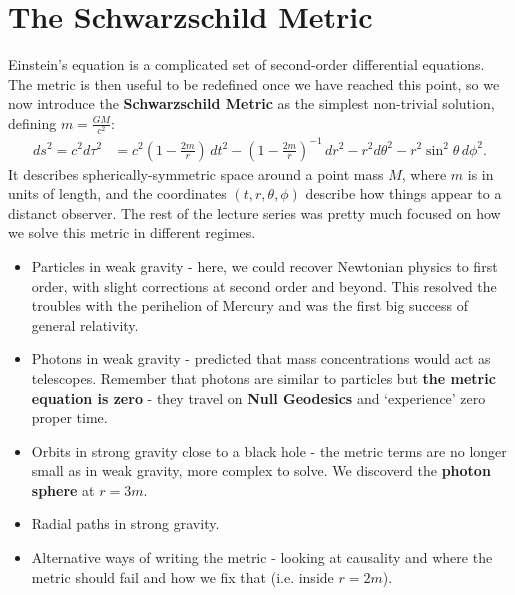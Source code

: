 \documentclass[a4paper, 11pt, normalem]{report}
\begin{document}
\section{The Schwarzschild Metric}
Einstein's equation is a complicated set of second-order differential equations. 
The metric is then useful to be redefined once we have reached this point, so we now introduce the \textbf{Schwarzschild Metric} as the simplest non-trivial solution, defining $m=\frac{GM}{c^2}$:
\begin{align}
    ds^2 = c^2d\tau^2 &= c^2\left(1-\frac{2m}{r}\right)\,dt^2 - \left(1-\frac{2m}{r}\right)^{-1}\,dr^2 - r^2d\theta^2 - r^2\sin^2\theta\,d\phi^2.
\end{align}
It describes spherically-symmetric space around a point mass $M$, where $m$ is in units of length, and the coordinates $(t,r,\theta,\phi)$ describe how things appear to a distanct observer.
The rest of the lecture series was pretty much focused on how we solve this metric in different regimes.
\begin{itemize}
    \item Particles in weak gravity - here, we could recover Newtonian physics to first order, with slight corrections at second order and beyond. 
        This resolved the troubles with the perihelion of Mercury and was the first big success of general relativity.
    \item Photons in weak gravity - predicted that mass concentrations would act as telescopes. 
        Remember that photons are similar to particles but \textbf{the metric equation is zero} - they travel on \textbf{Null Geodesics} and `experience' zero proper time. 
    \item Orbits in strong gravity close to a black hole - the metric terms are no longer small as in weak gravity, more complex to solve.
        We discoverd the \textbf{photon sphere} at $r=3m$.
    \item Radial paths in strong gravity.
    \item Alternative ways of writing the metric - looking at causality and where the metric should fail and how we fix that (i.e. inside $r=2m$).
\end{itemize}
\end{document}
